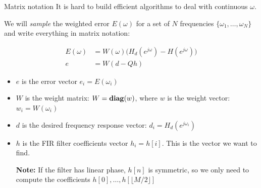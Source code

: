 \documentclass[10pt, handout]{beamer}
\begin{document}
\begin{frame}{Matrix notation}
	It is hard to build efficient algorithms to deal with continuous $\omega$.
	
	We will \textit{sample} the weighted error $E(\omega)$ for a set of $N$ frequencies $\{\omega_1, \ldots, \omega_N\}$ and write everything in matrix notation:
	
	\begin{align*}
		E(\omega) &= W(\omega)\Big(H_d(e^{j\omega}) - H(e^{j\omega})\Big) \tag{continuous weighted error} \\
		e &= W(d - Qh) \tag{matrix notation}
	\end{align*}
	
	\begin{itemize}
		\item $e$ is the error vector $e_i = E(\omega_i)$
		\item $W$ is the weight matrix: $W = \text{\textbf{diag}}(w)$, where $w$ is the weight vector: $w_i = W(\omega_i)$
		\item $d$ is the desired frequency response vector: $d_i =H_d(e^{j\omega_i})$
		\item $h$ is the FIR filter coefficients vector $h_i = h[i]$. This is the vector we want to find. 
		
		\textbf{Note:} If the filter has linear phase, $h[n]$ is symmetric, so we only need to compute the coefficients $h[0], \ldots, h[\lfloor M/2\rfloor]$
	\end{itemize}
\end{frame}
\end{document}
